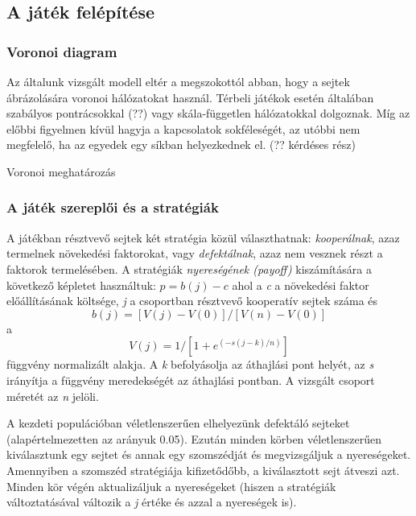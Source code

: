 \subsection{A játék felépítése}
\subsubsection{Voronoi diagram}
Az általunk vizsgált modell eltér a megszokottól abban, hogy a sejtek ábrázolására voronoi hálózatokat használ. Térbeli játékok esetén általában szabályos pontrácsokkal (??) vagy skála-független hálózatokkal dolgoznak. Míg az előbbi figyelmen kívül hagyja a kapcsolatok sokféleségét, az utóbbi nem megfelelő, ha az egyedek egy síkban helyezkednek el. (?? kérdéses rész)

Voronoi meghatározás  

\subsubsection{A játék szereplői és a stratégiák}
A játékban résztvevő sejtek két stratégia közül választhatnak: \textit{kooperálnak}, azaz termelnek növekedési faktorokat, vagy \textit{defektálnak}, azaz nem vesznek részt a faktorok termelésében. A stratégiák \textit{nyereségének (payoff)} kiszámítására a következő képletet használtuk: \(p = b(j) - c\) ahol a \textit{c} a növekedési faktor előállításának költsége, \textit{j} a csoportban résztvevő kooperatív sejtek száma és
\begin{equation}
b(j) = [V(j) - V(0)]/[V(n) - V(0)]
\end{equation}
a
\begin{equation}
V(j) = 1/[1 + e^{(-s(j-k)/n)}]
\end{equation}
függvény normalizált alakja. A \textit{k} befolyásolja az áthajlási pont helyét, az \textit{s} irányítja a függvény meredekségét az áthajlási pontban. A vizsgált csoport méretét az \textit{n} jelöli. 

A kezdeti populációban véletlenszerűen elhelyezünk defektáló sejteket (alapértelmezetten az arányuk 0.05). Ezután minden körben véletlenszerűen kiválasztunk egy sejtet és annak egy szomszédját és megvizsgáljuk a nyereségeket. Amennyiben a szomszéd stratégiája kifizetődőbb, a kiválasztott sejt átveszi azt. Minden kör végén aktualizáljuk a nyereségeket (hiszen a stratégiák változtatásával változik a \textit{j} értéke és azzal a nyereségek is). 

